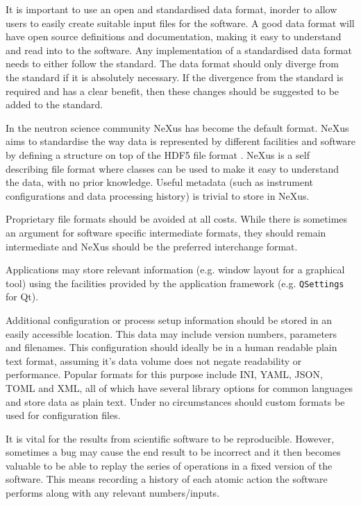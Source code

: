 \documentclass[jnr]{iosart2x}
\begin{document}
It is important to use an open and standardised data format, inorder to allow users to easily create suitable input files for the software.
A good data format will have open source definitions and documentation, making it easy to understand and read into to the software.
Any implementation of a standardised data format needs to either follow the standard.
The data format should only diverge from the standard if it is absolutely necessary.
If the divergence from the standard is required and has a clear benefit, then these changes should be suggested to be added to the standard.

In the neutron science community NeXus \cite{K_nnecke_2015} has become the default format.
NeXus aims to standardise the way data is represented by different facilities and software by defining a structure on top of the HDF5 file format \cite{HDF5}.
NeXus is a self describing file format where classes can be used to make it easy to understand the data, with no prior knowledge.
Useful metadata (such as instrument configurations and data processing history) is trivial to store in NeXus.

Proprietary file formats should be avoided at all costs.
While there is sometimes an argument for software specific intermediate formats, they should remain intermediate and NeXus should be the preferred interchange format.

Applications may store relevant information (e.g. window layout for a graphical tool) using the facilities provided by the application framework (e.g. \texttt{QSettings} for Qt).

Additional configuration or process setup information should be stored in an easily accessible location.
This data may include version numbers, parameters and filenames.
This configuration should ideally be in a human readable plain text format, assuming it's data volume does not negate readability or performance.
Popular formats for this purpose include INI, YAML, JSON, TOML and XML, all of which have several library options for common languages and store data as plain text.
Under no circumstances should custom formats be used for configuration files.

It is vital for the results from scientific software to be reproducible.
However, sometimes a bug may cause the end result to be incorrect and it then becomes valuable to be able to replay the series of operations in a fixed version of the software.
This means recording a history of each atomic action the software performs along with any relevant numbers/inputs.
\end{document}
